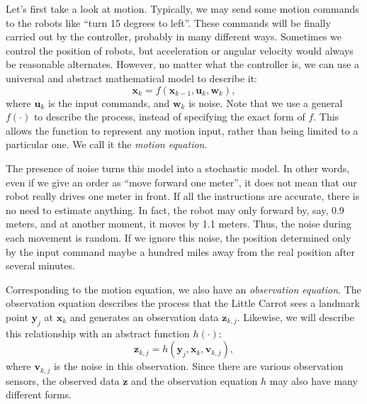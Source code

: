 Let's first take a look at motion. Typically, we may send some motion commands to the robots like ``turn 15 degrees to left''. These commands will be finally carried out by the controller, probably in many different ways. Sometimes we control the position of robots, but acceleration or angular velocity would always be reasonable alternates. However, no matter what the controller is, we can use a universal and abstract mathematical model to describe it:
\begin{equation}
{\mathbf{x}_k} = f\left( {{\mathbf{x}_{k - 1}},{\mathbf{u}_k}, \mathbf{w}_k} \right),
\end{equation}
where $\mathbf{u}_k$ is the input commands, and $\mathbf{w}_k$ is noise. Note that we use a general $f(\cdot)$ to describe the process, instead of specifying the exact form of $f$. This allows the function to represent any motion input, rather than being limited to a particular one. We call it the \emph{motion equation}.

The presence of noise turns this model into a stochastic model. In other words, even if we give an order as ``move forward one meter'', it does not mean that our robot really drives one meter in front. If all the instructions are accurate, there is no need to estimate anything. In fact, the robot may only forward by, say, 0.9 meters, and at another moment, it moves by 1.1 meters. Thus, the noise during each movement is random. If we ignore this noise, the position determined only by the input command maybe a hundred miles away from the real position after several minutes.

Corresponding to the motion equation, we also have an \textit{observation equation}. The observation equation describes the process that the Little Carrot sees a landmark point $\mathbf{y}_j$ at $\mathbf{x}_k$ and generates an observation data $\mathbf{z}_{k,j}$. Likewise, we will describe this relationship with an abstract function $h(\cdot)$:
\begin{equation}
{\mathbf{z}_{k,j}} = h\left( {{\mathbf{y}_j},{\mathbf{x}_k}, \mathbf{v}_{k,j} } \right),
\end{equation}
where $\mathbf{v}_{k,j}$ is the noise in this observation. Since there are various observation sensors, the observed data $\mathbf{z}$ and the observation equation $h$ may also have many different forms.

